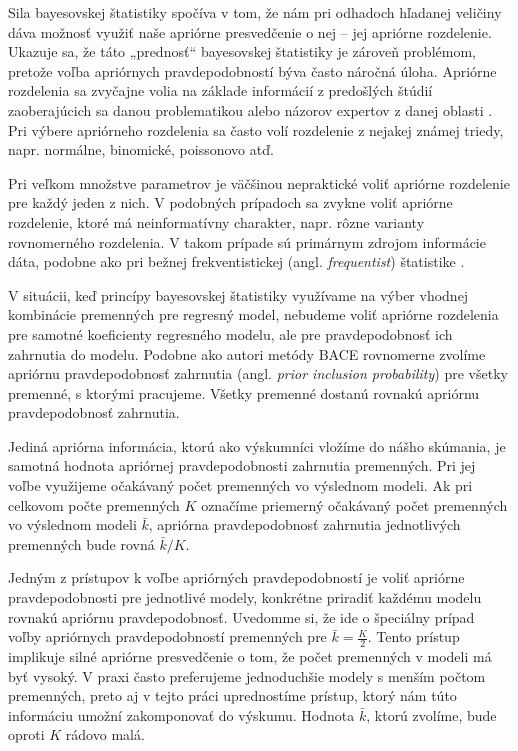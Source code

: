 Sila bayesovskej štatistiky spočíva v tom, že nám pri odhadoch hľadanej veličiny dáva možnosť využiť naše apriórne presvedčenie o nej – jej apriórne rozdelenie.
Ukazuje sa, že táto „prednosť“ bayesovskej štatistiky je zároveň problémom, pretože voľba apriórnych pravdepodobností býva často náročná úloha.
Apriórne rozdelenia sa zvyčajne volia na základe informácií z predošlých štúdií zaoberajúcich sa danou problematikou alebo názorov expertov z danej oblasti \cite{carlin}.
Pri výbere apriórneho rozdelenia sa často volí rozdelenie z nejakej známej triedy, napr. normálne, binomické, poissonovo atď.

Pri veľkom množstve parametrov je väčšinou nepraktické voliť apriórne rozdelenie pre každý jeden z nich.
V podobných prípadoch sa zvykne voliť apriórne rozdelenie, ktoré má neinformatívny charakter, napr. rôzne varianty rovnomerného rozdelenia.
V takom prípade sú primárnym zdrojom informácie dáta, podobne ako pri bežnej frekventistickej (angl. \emph{frequentist}) štatistike \cite{tiao}.

V situácii, keď princípy bayesovskej štatistiky využívame na výber vhodnej kombinácie premenných pre regresný model,
nebudeme voliť apriórne rozdelenia pre samotné koeficienty regresného modelu, ale pre pravdepodobnosť ich zahrnutia do modelu.
Podobne ako autori metódy BACE rovnomerne zvolíme apriórnu pravdepodobnosť zahrnutia (angl. \emph{prior inclusion probability}) pre všetky premenné,
s ktorými pracujeme. Všetky premenné dostanú rovnakú apriórnu pravdepodobnosť zahrnutia.

Jediná apriórna informácia, ktorú ako výskumníci vložíme do nášho skúmania,
je samotná hodnota apriórnej pravdepodobnosti zahrnutia premenných.
Pri jej voľbe využijeme očakávaný počet premenných vo výslednom modeli.
Ak pri celkovom počte premenných \(K\) označíme priemerný očakávaný počet premenných vo výslednom modeli \(\bar{k}\),
apriórna pravdepodobnosť zahrnutia jednotlivých premenných bude rovná \(\bar{k}/K\).

Jedným z prístupov k voľbe apriórných pravdepodobností je voliť apriórne pravdepodobnosti pre jednotlivé modely,
konkrétne priradiť každému modelu rovnakú apriórnu pravdepodobnosť.
Uvedomme si, že ide o špeciálny prípad voľby apriórnych pravdepodobností premenných pre \(\bar{k} = \frac{K}{2}\).
Tento prístup implikuje silné apriórne presvedčenie o tom, že počet premenných v modeli má byť vysoký.
V praxi často preferujeme jednoduchšie modely s menším počtom premenných, preto aj v tejto práci uprednostíme prístup,
ktorý nám túto informáciu umožní zakomponovať do výskumu.
Hodnota \(\bar{k}\), ktorú zvolíme, bude oproti \(K\) rádovo malá.


